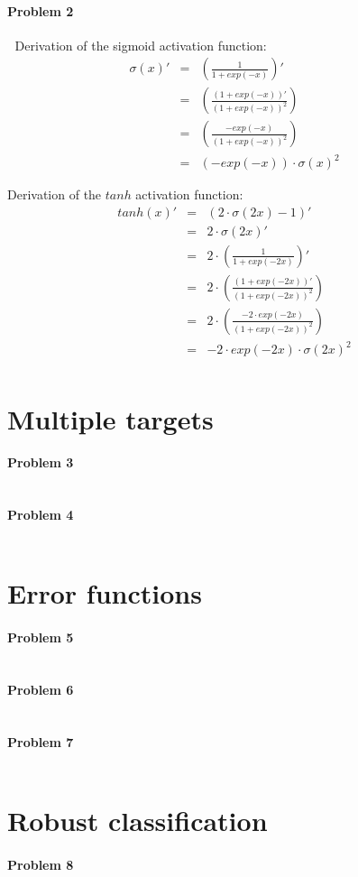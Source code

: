 \documentclass{article}
\begin{document}
\paragraph*{Problem 2}
$\;$
Derivation of the sigmoid activation function:
\begin{eqnarray}
\sigma(x)' &=& \left( \frac{1}{1 + exp(-x)} \right)' \\
&=& \left( \frac{(1 + exp(-x))'}{(1 + exp(-x))^2} \right)\\
&=& \left( \frac{-exp(-x)}{(1 + exp(-x))^2} \right)\\
&=& (-exp(-x)) \cdot \sigma(x)^2
\end{eqnarray}

Derivation of the $tanh$ activation function:
\begin{eqnarray}
tanh(x)' &=& (2 \cdot \sigma(2x) -1)'\\
&=& 2 \cdot \sigma(2x)' \\
&=& 2 \cdot \left( \frac{1}{1 + exp(-2x)} \right)' \\
&=& 2 \cdot \left( \frac{(1 + exp(-2x))'}{(1 + exp(-2x))^2} \right)\\
&=& 2 \cdot \left( \frac{-2 \cdot exp(-2x)}{(1 + exp(-2x))^2} \right)\\
&=& -2 \cdot exp(-2x) \cdot \sigma(2x)^2\\
\end{eqnarray}

\section{Multiple targets}

\paragraph*{Problem 3}
$\;$ 

\paragraph*{Problem 4}
$\;$ 

\section{Error functions}

\paragraph*{Problem 5}
$\;$

\paragraph*{Problem 6}
$\;$ 

\paragraph*{Problem 7}
$\;$ 

\section{Robust classification}

\paragraph*{Problem 8}
$\;$ 
\end{document}
